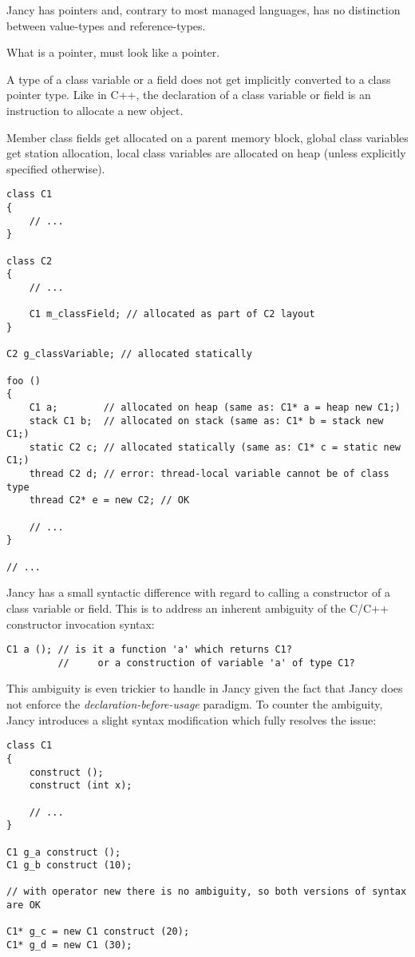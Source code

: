 \documentclass[oneside]{book}
\begin{document}
Jancy has pointers and, contrary to most managed languages, has no distinction between value-types and reference-types.

What is a pointer, must look like a pointer.

A type of a class variable or a field does not get implicitly converted to a class pointer type. Like in C++, the declaration of a class variable or field is an instruction to allocate a new object.

Member class fields get allocated on a parent memory block, global class variables get station allocation, local class variables are allocated on heap (unless explicitly specified otherwise).

\begin{lstlisting}
class C1 
{
    // ...
}

class C2
{
    // ...

    C1 m_classField; // allocated as part of C2 layout
}

C2 g_classVariable; // allocated statically

foo ()
{
    C1 a;        // allocated on heap (same as: C1* a = heap new C1;)
    stack C1 b;  // allocated on stack (same as: C1* b = stack new C1;)
    static C2 c; // allocated statically (same as: C1* c = static new C1;)
    thread C2 d; // error: thread-local variable cannot be of class type
    thread C2* e = new C2; // OK

    // ...
}

// ...
\end{lstlisting}

Jancy has a small syntactic difference with regard to calling a constructor of a class variable or field. This is to address an inherent ambiguity of the C/C++ constructor invocation syntax:

\begin{lstlisting}
C1 a (); // is it a function 'a' which returns C1?
         //     or a construction of variable 'a' of type C1?
\end{lstlisting}

This ambiguity is even trickier to handle in Jancy given the fact that Jancy does not enforce the \emph{declaration-before-usage} paradigm. To counter the ambiguity, Jancy introduces a slight syntax modification which fully resolves the issue:

\begin{lstlisting}
class C1
{
    construct ();
    construct (int x);

    // ...
}

C1 g_a construct (); 
C1 g_b construct (10);

// with operator new there is no ambiguity, so both versions of syntax are OK

C1* g_c = new C1 construct (20); 
C1* g_d = new C1 (30);
\end{lstlisting}
\end{document}
